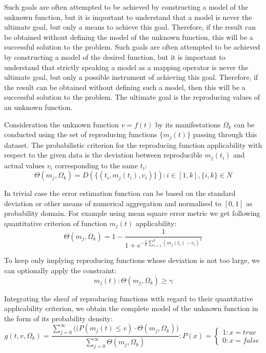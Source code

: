 \documentclass[a4paper, 11pt, oneside]{book}
\begin{document}
Such goals are often attempted to be achieved by constructing a model of the unknown function, but it is important to understand that a model is never the ultimate goal, but only a means to achieve this goal. Therefore, if the result can be obtained without defining the model of the unknown function, this will be a successful solution to the problem.
Such goals are often attempted to be achieved by constructing a model of the desired function, but it is important to understand that strictly speaking a model as a mapping operator is never the ultimate goal, but only a possible instrument of achieving this goal. Therefore, if the result can be obtained without defining such a model, then this will be a successful solution to the problem. The ultimate goal is the reproducing values of an unknown function.

Consideration the unknown function $v = f(t)$ by its manifestations $\Omega_k$ can be conducted using the set of reproducing functions $\{m_j(t)\}$ passing through this dataset. The probabilistic criterion for the reproducing function applicability with respect to the given data is the deviation between reproducible $m_j(t_i)$ and actual values $v_i$ corresponding to the same $t_i$:
\begin{equation}\label{eq:deviation-of-2d-dataset}
  \Theta(m_j, \Omega_k) = D(\{(t_i, m_j(t_i), v_i)\}): i \in [1, k], \{i, k\} \in N
\end{equation}

In trivial case the error estimation function can be based on the standard deviation or other means of numerical aggregation and normalised to $[0, 1]$ as probability domain. For example using mean square error metric we get following quantitative criterion of function $m_j(t)$ applicability:
\begin{equation}\label{eq:MSE-of-2d-dataset}
  \Theta(m_j, \Omega_k) = 1 - \frac{1}{1 + e^{\displaystyle -\frac{1}{k} \sum_{i = 1}^k (m_j(t_i) - v_i)^2}}
\end{equation}

To keep only implying reproducing functions whose deviation is not too large, we can optionally apply the constraint:
\begin{equation}\label{eq:acceptable-deviation-of-2d-dataset}
  {m_j(t)}: \Theta(m_j, \Omega_k) \geq \gamma
\end{equation}

Integrating the sheaf of reproducing functions with regard to their quantitative applicability criterion, we obtain the complete model of the unknown function in the form of its probability density:
\begin{equation}\label{eq:full_model-for-2d-dataset}
  g(t, v, \Omega_k) = \frac{\displaystyle \sum_{j = 0}^{\infty} \Big((P(m_j(t) \leq v) \cdot \Theta(m_j, \Omega_k) \Big)}{\displaystyle \sum_{j = 0}^{\infty}\Theta(m_j, \Omega_k)}: P(x) = \begin{cases}1: x = true\\0: x = false \end{cases}
\end{equation}
\end{document}
